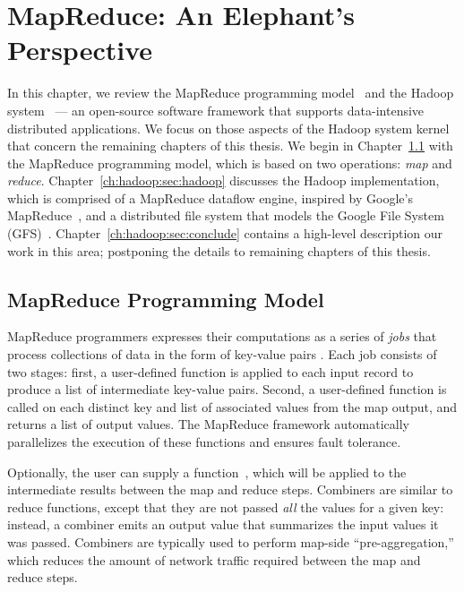 \chapter[MapReduce: An Elephant's Perspective]{MapReduce: An Elephant's Perspective}
\label{ch:hadoop}

In this chapter, we review the MapReduce programming
model~\cite{mapreduce-osdi} and the Hadoop system~\cite{hadoop} --- an
open-source software framework that supports data-intensive distributed
applications.  We focus on those aspects of the Hadoop system kernel that
concern the remaining chapters of this thesis.  We begin in
Chapter~\ref{ch:hadoop:sec:progmodel} with the MapReduce programming model,
which is based on two operations: {\em map} and {\em reduce}.
Chapter~\ref{ch:hadoop:sec:hadoop} discusses the Hadoop implementation, which
is comprised of a MapReduce dataflow engine, inspired by Google's
MapReduce~\cite{mapreduce-osdi}, and a distributed file system that models the
Google File System (GFS)~\cite{gfs-sosp}.  Chapter~\ref{ch:hadoop:sec:conclude}
contains a high-level description our work in this area; postponing the details
to remaining chapters of this thesis.

\section{MapReduce Programming Model}
\label{ch:hadoop:sec:progmodel}

MapReduce programmers expresses their computations as a series of {\em jobs}
that process collections of data in the form of key-value pairs . Each job
consists of two stages: first, a user-defined  function is applied to
each input record to produce a list of intermediate key-value pairs.  Second, a
user-defined  function is called on each distinct key and
list of associated values from the map output, and returns a list of output
values.  The MapReduce framework automatically parallelizes the execution of
these functions and ensures fault tolerance.

Optionally, the user can supply a 
function~\cite{mapreduce-osdi}, which will be applied to the intermediate
results between the map and reduce steps.  Combiners are similar to reduce
functions, except that they are not passed {\em all} the values for a given
key: instead, a combiner emits an output value that summarizes the input values
it was passed.  Combiners are typically used to perform map-side
``pre-aggregation,'' which reduces the amount of network traffic required
between the map and reduce steps.

